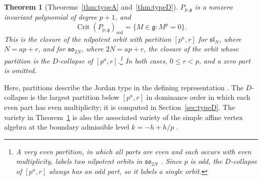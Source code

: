 \documentclass[10pt,reqno]{amsart}
\numberwithin{equation}{section}
\theoremstyle{plain}
\newtheorem{theorem}{Theorem}[section]
\theoremstyle{definition}
\DeclareMathOperator{\Crit}{Crit}
\newcommand{\red}{\mathrm{red}}
\begin{document}
\begin{theorem}[Theorems~\ref{thm:typeA} and~\ref{thm:typeD}]\label{thm:mainB}
$P_{p,\mathfrak{g}}$ is a nonzero invariant polynomial of degree $p+1$, and
\begin{equation}
	\Crit(P_{p,\mathfrak{g}})_\red=\{M\in\mathfrak{g} : M^p=0\}.
\end{equation}
This is the closure of the nilpotent orbit with partition $[p^a,r]$ for $\mathfrak{sl}_N$, where $N=ap+r$, and for $\mathfrak{so}_{2N}$, where $2N=ap+r$, the closure of the orbit whose partition is the $D$-collapse of $[p^a,r]$.\footnote{A very even partition, in which all parts are even and each occurs with even multiplicity, labels two nilpotent orbits in $\mathfrak{so}_{2N}$ \cite{CM}. Since $p$ is odd, the $D$-collapse of $[p^a,r]$ always has an odd part, so it labels a single orbit.} In both cases, $0\le r<p$, and a zero part is omitted.
\end{theorem}

Here, partitions describe the Jordan type in the defining representation \cite{CM}. The $D$-collapse is the largest partition below $[p^a,r]$ in dominance order in which each even part has even multiplicity; it is computed in Section~\ref{sec:typeD}. The variety in Theorem~\ref{thm:mainB} is also the associated variety of the simple affine vertex algebra at the boundary admissible level $k=-h+h/p$ \cite{KW88,KWb,AvEM}.
\end{document}
